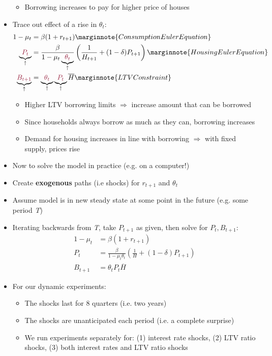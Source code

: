 \documentclass[a4paper]{article}
\begin{document}
\begin{itemize}
\begin{itemize}
			\item Borrowing increases to pay for higher price of houses
		\end{itemize}
		\item Trace out effect of a rise in \textcolor{myred}{\( \theta_t \)}:
		\begin{align*}
			1-\mu_t&=\beta(1+r_{t+1}) \marginnote{Consumption Euler Equation}\\
			\underbrace{\textcolor{myred}{P_t}}_\uparrow&=\frac{\beta}{1-\mu_t\underbrace{\textcolor{myred}{\theta_t}}_\uparrow}\left( \frac{1}{H_{t+1}} + (1-\delta)P_{t+1} \right) \marginnote{Housing Euler Equation}\\
			\underbrace{\textcolor{myred}{B_{t+1}}}_\uparrow&=\underbrace{\textcolor{myred}{\theta_t}}_\uparrow\underbrace{\textcolor{myred}{P_t}}_\uparrow\overline{H} \marginnote{LTV Constraint} 
		\end{align*}
		\begin{itemize}
			\item Higher LTV borrowing limits \( \Rightarrow \) increase amount that can be borrowed
			\item Since households always borrow as much as they can, borrowing increases
			\item Demand for housing increases in line with borrowing \( \Rightarrow \) with fixed supply, prices rise
		\end{itemize}
		\item Now to solve the model in practice (e.g. on a computer!)
		\item Create \textbf{exogenous} paths (i.e shocks) for \( r_{t+1} \) and \( \theta_t \)
		\item Assume model is in new steady state at some point in the future (e.g. some period \textit{T})
		\item Iterating backwards from \textit{T}, take \( P_{t+1} \) as given, then solve for \( P_t,B_{t+1} \):
		\begin{align*}
			1- \mu_t &= \beta(1+r_{t+1}) \\
			P_t &= \frac{\beta}{1-\mu_t\theta_t}\left( \frac{1}{H} + (1-\delta)P_{t+1} \right)\\
			B_{t+1} &= \theta_tP_t\overline{H}
		\end{align*}
		\item For our dynamic experiments:
		\begin{itemize}
			\item The shocks last for 8 quarters (i.e. two years)
			\item The shocks are unanticipated each period (i.e. a complete surprise)
			\item We run experiments separately for: (1) interest rate shocks, (2) LTV ratio shocks, (3) both interest rates and LTV ratio shocks
		\end{itemize}
	\end{itemize}
\end{document}
